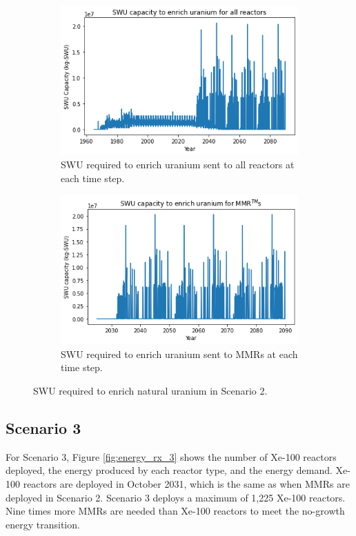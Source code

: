 \begin{figure}
    \centering
    \begin{subfigure}{0.45\textwidth}
        \centering
        \includegraphics[scale=0.4]{../figures/totalswu_scenarios_2.png}
        \caption{\gls{SWU} required to enrich uranium sent to all reactors at each time step.}
        \label{fig:totalswu_2}
    \end{subfigure}
    \hspace{0.8cm}
    \begin{subfigure}{0.45\textwidth}
        \centering
        \includegraphics[scale=0.4]{../figures/haleuSWU_scenarios_2.png}
        \caption{\gls{SWU} required to enrich uranium sent to \glspl{MMR} at each time step.}
        \label{fig:haleuswu_2}
    \end{subfigure}
    \caption{\gls{SWU} required to enrich natural uranium in Scenario 2.}
    \label{fig:swu_2}
\end{figure}

\subsection{Scenario 3}
For Scenario 3, Figure \ref{fig:energy_rx_3} shows the number of Xe-100 
reactors deployed, the energy produced by each reactor type, and the 
energy demand. Xe-100 reactors are deployed in October 2031, which is the 
same as when \glspl{MMR}
are deployed in Scenario 2. Scenario 3 deploys a maximum of 1,225 Xe-100 
reactors. Nine times more \glspl{MMR} are needed than Xe-100 reactors to 
meet the no-growth energy transition.

